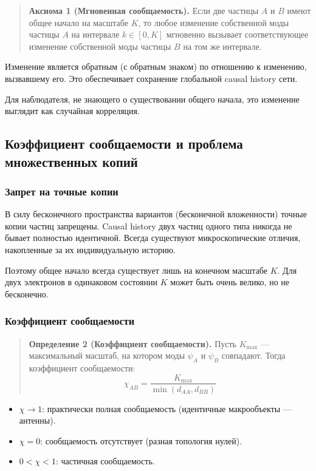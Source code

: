 \documentclass[12pt,a4paper]{article}
\begin{document}
\begin{quote}
\textbf{Аксиома 1 (Мгновенная сообщаемость).} Если две частицы $A$ и $B$ имеют общее начало на масштабе $K$, то любое изменение собственной моды частицы $A$ на интервале $k \in [0, K]$ мгновенно вызывает соответствующее изменение собственной моды частицы $B$ на том же интервале.
\end{quote}

Изменение является обратным (с обратным знаком) по отношению к изменению, вызвавшему его. Это обеспечивает сохранение глобальной causal history сети.

Для наблюдателя, не знающего о существовании общего начала, это изменение выглядит как случайная корреляция.

\subsection{Коэффициент сообщаемости и проблема множественных копий}

\subsubsection{Запрет на точные копии}
В силу бесконечного пространства вариантов (бесконечной вложенности) точные копии частиц запрещены. Causal history двух частиц одного типа никогда не бывает полностью идентичной. Всегда существуют микроскопические отличия, накопленные за их индивидуальную историю.

Поэтому общее начало всегда существует лишь на конечном масштабе $K$. Для двух электронов в одинаковом состоянии $K$ может быть очень велико, но не бесконечно.

\subsubsection{Коэффициент сообщаемости}

\begin{quote}
\textbf{Определение 2 (Коэффициент сообщаемости).} Пусть $K_{\max}$ --- максимальный масштаб, на котором моды $\psi_A$ и $\psi_B$ совпадают. Тогда коэффициент сообщаемости:
\begin{equation}
    \chi_{AB} = \frac{K_{\max}}{\min(d_{AA}, d_{BB})}
\end{equation}
\end{quote}

\begin{itemize}
    \item $\chi \to 1$: практически полная сообщаемость (идентичные макрообъекты --- антенны).
    \item $\chi = 0$: сообщаемость отсутствует (разная топология нулей).
    \item $0 < \chi < 1$: частичная сообщаемость.
\end{itemize}
\end{document}
